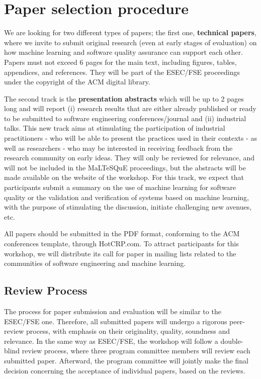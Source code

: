 
\section{Paper selection procedure}
\label{sec:submissions}

We are looking for two different types of papers; the first one, \ie \textbf{technical papers}, where we invite to submit original research (even at early stages of evaluation) on how machine learning and software quality assurance can support each other.
Papers must not exceed 6 pages for the main text, including figures, tables, appendices, and references.
They will be part of the ESEC/FSE proceedings under the copyright of the ACM digital library.

The second track is the \ie \textbf{presentation abstracts} which will be up to 2 pages long and will report (i) research results that are either already published or ready to be submitted to software engineering conferences/journal and (ii) industrial talks. This new track aims at stimulating the participation of industrial practitioners - who will be able to present the practices used in their contexts - as well as researchers - who may be interested in receiving feedback from the research community on early ideas. They will only be reviewed for relevance, and will not be included in the MaLTeSQuE proceedings, but the abstracts will be made available on the website of the workshop.
For this track, we expect that participants submit a summary on the use of machine learning for software quality or the validation and verification of systems based on machine learning, with the purpose of stimulating the discussion, initiate challenging new avenues, etc.

All papers should be submitted in the PDF format, conforming to the ACM conferences template, through HotCRP.com.
To attract participants for this workshop, we will distribute its call for paper in mailing lists related to the communities of software engineering and machine learning.

\subsection{Review Process}

The process for paper submission and evaluation will be similar to the ESEC/FSE one.
Therefore, all submitted papers will undergo a rigorous peer-review process, with emphasis on their originality, quality, soundness and relevance.
In the same way as ESEC/FSE, the workshop will follow a double-blind review process, where three program committee members will review each submitted paper.
Afterward, the program committee will jointly make the final decision concerning the acceptance of individual papers, based on the reviews.


